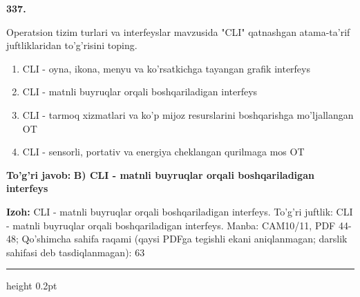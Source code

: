 \documentclass[10pt,a4paper]{article}
\begin{document}
{\bfseries\sffamily\color{ink} 337.}
\par
Operatsion tizim turlari va interfeyslar mavzusida "CLI" qatnashgan atama-ta'rif juftliklaridan to'g'risini toping.
\begin{enumerate}[label=\Alph*),leftmargin=9mm]
\item CLI - oyna, ikona, menyu va ko'rsatkichga tayangan grafik interfeys
\item CLI - matnli buyruqlar orqali boshqariladigan interfeys
\item CLI - tarmoq xizmatlari va ko'p mijoz resurslarini boshqarishga mo'ljallangan OT
\item CLI - sensorli, portativ va energiya cheklangan qurilmaga mos OT
\end{enumerate}
\begin{tcolorbox}[enhanced,breakable,colback=teal!4,colframe=teal!60!black,boxrule=0.45pt,arc=1.2mm,left=2.7mm,right=2.7mm,top=1.8mm,bottom=1.8mm,before skip=2mm,after skip=2mm]
{\bfseries\sffamily\color{teal}To'g'ri javob:} \textbf{B) CLI - matnli buyruqlar orqali boshqariladigan interfeys}
\par\smallskip
{\bfseries Izoh:} CLI - matnli buyruqlar orqali boshqariladigan interfeys. To'g'ri juftlik: CLI - matnli buyruqlar orqali boshqariladigan interfeys. Manba: CAM10/11, PDF 44-48; Qo'shimcha sahifa raqami (qaysi PDFga tegishli ekani aniqlanmagan; darslik sahifasi deb tasdiqlanmagan): 63
\end{tcolorbox}
\vspace{2mm}\hrule height 0.2pt\vspace{3mm}
\end{document}
